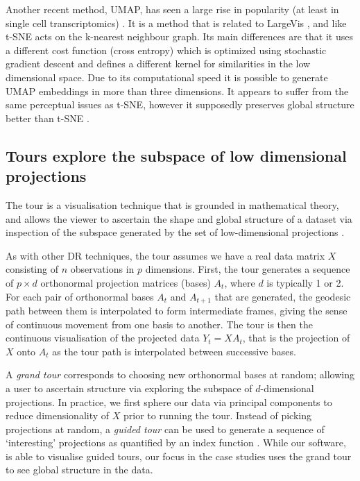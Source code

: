 \documentclass[article,notitle]{jdssv}
\begin{document}
Another recent method, UMAP, has seen a large rise in popularity (at least in
single cell transcriptomics) \citep{McInnes2018-co}. It is a method that is related to
LargeVis \citep{Tang2016-oz}, and like t-SNE acts on the k-nearest neighbour graph.
Its main differences are that it uses a different cost function (cross entropy)
which is optimized using stochastic gradient descent and defines a different
kernel for similarities in the low dimensional space. Due to its computational
speed it is possible to generate UMAP embeddings in more than three dimensions.
It appears to suffer from the same perceptual issues as t-SNE, however it supposedly preserves global structure better than t-SNE \citep{Coenen2019-to}.

\hypertarget{tours-explore-the-subspace-of-low-dimensional-projections}{%
\subsection{Tours explore the subspace of low dimensional projections}\label{tours-explore-the-subspace-of-low-dimensional-projections}}

The tour is a visualisation technique that is grounded in
mathematical theory, and allows the viewer to ascertain
the shape and global structure of a dataset via inspection of the subspace generated by the set of low-dimensional projections \citep{Asimov1985-vp, Buja1986-zr}.

As with other DR techniques, the tour assumes we have a real data matrix
\(X\) consisting of \(n\) observations in \(p\) dimensions. First, the tour generates
a sequence of \(p \times d\) orthonormal projection matrices (bases)
\(A_t\), where \(d\) is typically 1 or 2. For each pair of
orthonormal bases \(A_{t}\) and \(A_{t+1}\) that are generated, the geodesic
path between them is interpolated to form intermediate frames, giving the
sense of continuous movement from one basis to another. The tour is then the
continuous visualisation of the projected data \(Y_{t} = XA_{t}\), that is the
projection of \(X\) onto \(A_{t}\) as the tour path is interpolated between
successive bases.

A \emph{grand tour} corresponds to choosing new orthonormal
bases at random; allowing a user to ascertain structure via exploring the
subspace of \(d\)-dimensional projections. In practice, we first sphere
our data via principal components to reduce dimensionality of \(X\) prior to
running the tour. Instead of picking projections at
random, a \emph{guided tour} can be used to generate a sequence of `interesting'
projections as quantified by an index function \citep{Cook1995-bi}. While our software,
 is able to visualise guided tours, our focus in the case studies
uses the grand tour to see global structure in the data.
\end{document}
